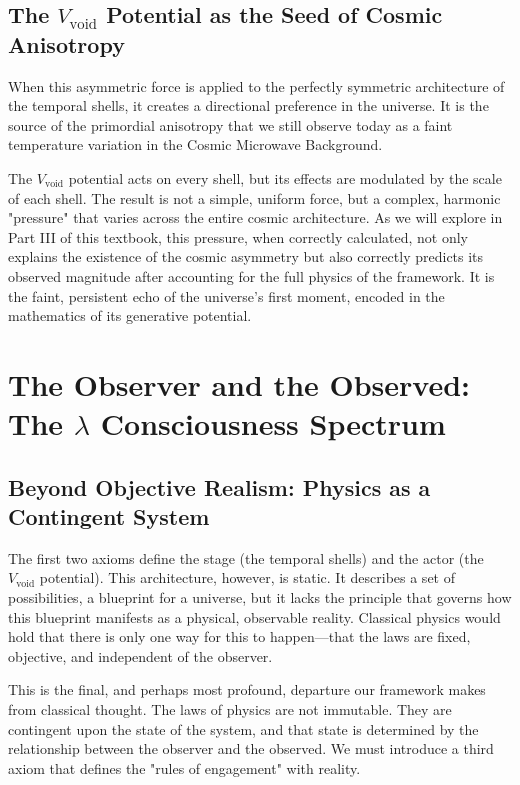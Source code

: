 \documentclass[12pt]{report}
\begin{document}
\section{The \texorpdfstring{$V_{\text{void}}$}{V_void} Potential as the Seed of Cosmic Anisotropy}
When this asymmetric force is applied to the perfectly symmetric architecture of the temporal shells, it creates a directional preference in the universe. It is the source of the primordial anisotropy that we still observe today as a faint temperature variation in the Cosmic Microwave Background.

The $V_{\text{void}}$ potential acts on every shell, but its effects are modulated by the scale of each shell. The result is not a simple, uniform force, but a complex, harmonic "pressure" that varies across the entire cosmic architecture. As we will explore in Part III of this textbook, this pressure, when correctly calculated, not only explains the existence of the cosmic asymmetry but also correctly predicts its observed magnitude after accounting for the full physics of the framework. It is the faint, persistent echo of the universe's first moment, encoded in the mathematics of its generative potential.
\chapter{The Observer and the Observed: The \texorpdfstring{$\lambda$}{λ} Consciousness Spectrum}

\section{Beyond Objective Realism: Physics as a Contingent System}
The first two axioms define the stage (the temporal shells) and the actor (the $V_{\text{void}}$ potential). This architecture, however, is static. It describes a set of possibilities, a blueprint for a universe, but it lacks the principle that governs how this blueprint manifests as a physical, observable reality. Classical physics would hold that there is only one way for this to happen—that the laws are fixed, objective, and independent of the observer.

This is the final, and perhaps most profound, departure our framework makes from classical thought. The laws of physics are not immutable. They are contingent upon the state of the system, and that state is determined by the relationship between the observer and the observed. We must introduce a third axiom that defines the "rules of engagement" with reality.
\end{document}
